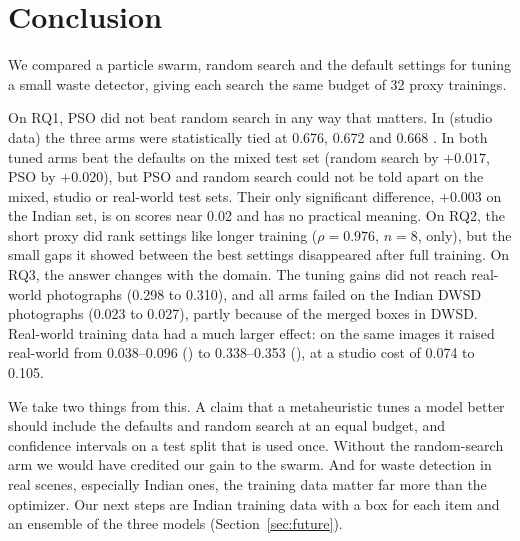 \section{Conclusion}
\label{sec:conclusion}

We compared a particle swarm, random search and the default settings for tuning a small waste detector, giving each search the same budget of 32 proxy trainings.

On RQ1, PSO did not beat random search in any way that matters. In \genone (studio data) the three arms were statistically tied at 0.676, 0.672 and 0.668 \mapfifty. In \gentwo both tuned arms beat the defaults on the mixed test set (random search by $+0.017$, PSO by $+0.020$), but PSO and random search could not be told apart on the mixed, studio or real-world test sets. Their only significant difference, $+0.003$ on the Indian set, is on scores near 0.02 and has no practical meaning. On RQ2, the short proxy did rank settings like longer training ($\rho = 0.976$, $n = 8$, \genone only), but the small gaps it showed between the best settings disappeared after full training. On RQ3, the answer changes with the domain. The tuning gains did not reach real-world photographs (0.298 to 0.310), and all arms failed on the Indian DWSD photographs (0.023 to 0.027), partly because of the merged boxes in DWSD. Real-world training data had a much larger effect: on the same images it raised real-world \mapfifty from 0.038--0.096 (\genone) to 0.338--0.353 (\gentwo), at a studio cost of 0.074 to 0.105.

We take two things from this. A claim that a metaheuristic tunes a model better should include the defaults and random search at an equal budget, and confidence intervals on a test split that is used once. Without the random-search arm we would have credited our \gentwo gain to the swarm. And for waste detection in real scenes, especially Indian ones, the training data matter far more than the optimizer. Our next steps are Indian training data with a box for each item and an ensemble of the three models (Section~\ref{sec:future}).
